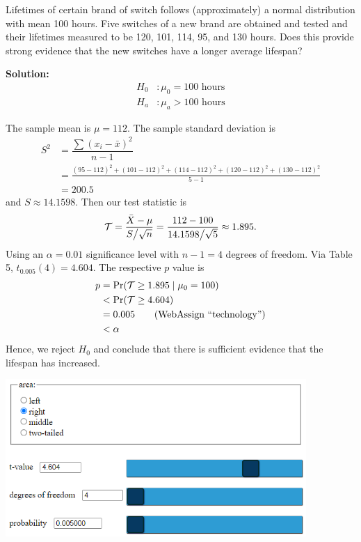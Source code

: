 Lifetimes of certain brand of switch follows (approximately) a normal distribution with mean 100 hours.  Five switches of a new brand are obtained and tested and their lifetimes measured to be 120, 101, 114, 95, and 130 hours.  Does this provide strong evidence that the new switches have a longer average lifespan?
\begin{mybox}
    \textbf{Solution:} 
    \begin{align*}
        H_0 &: \mu_0 = 100 \text{ hours}
        \\ H_a &: \mu_a > 100 \text{ hours} 
    \end{align*}
    
    The sample mean is $\mu = 112$. The sample standard deviation is
    \begin{align*}
        S^2 &= \dfrac{\sum(x_i-\bar{x})^2}{n-1}\\
        &= \frac{(95-112)^2 + (101-112)^2 + (114-112)^2 + (120-112)^2 + (130-112)^2}{5-1}  \\ &= 200.5
    \end{align*}
    and $S \approx 14.1598$. Then our test statistic is
    $$\mathcal{T} = \frac{\bar{X} - \mu}{S \big/ \sqrt{n}} = \frac{112-100}{14.1598 \big/ \sqrt{5}} \approx 1.895.$$
    Using an $\alpha = 0.01$ significance level with $n-1 = 4$ degrees of freedom. Via Table 5, $t_{0.005}(4) = 4.604$. The respective $p$ value is
    \begin{align*}
        p &= \Pr(\mathcal{T} \geq 1.895 \mid \mu_0 = 100)\\
        &< \Pr(\mathcal{T} \geq 4.604)\\
        &= 0.005  \tag{WebAssign \say{technology}}\\
        &< \alpha
    \end{align*}
    Hence, we reject $H_0$ and conclude that there is sufficient evidence that the\\ lifespan has increased.
    \noindent \begin{center}\includegraphics[width=4.5in]{p2.PNG}
    \end{center}
\end{mybox}